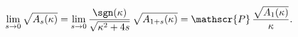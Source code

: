 \begin{equation}
\lim_{s\to 0} \sqrt{A_s(\kappa)} =
\lim_{s\to 0} \frac{\sgn(\kappa)}{\sqrt{\kappa^2+4s}}\, \sqrt{A_{1+s}(\kappa)}
=\mathscr{P}\,\frac{\sqrt{A_1(\kappa)}}{\kappa}.
\label{510}
\end{equation}

